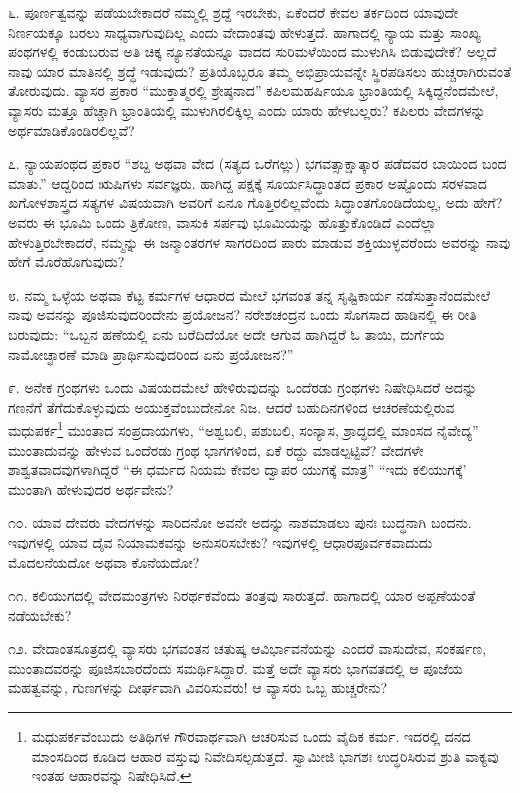 ೬. ಪೂರ್ಣತ್ವವನ್ನು ಪಡೆಯಬೇಕಾದರೆ ನಮ್ಮಲ್ಲಿ ಶ್ರದ್ದೆ ಇರಬೇಕು, ಏಕೆಂದರೆ ಕೇವಲ ತರ್ಕದಿಂದ ಯಾವುದೇ ನಿರ್ಣಯಕ್ಕೂ ಬರಲು ಸಾಧ್ಯವಾಗುವುದಿಲ್ಲ ಎಂದು ವೇದಾಂತವು ಹೇಳುತ್ತದೆ. ಹಾಗಾದಲ್ಲಿ ನ್ಯಾಯ ಮತ್ತು ಸಾಂಖ್ಯ ಪಂಥಗಳಲ್ಲಿ ಕಂಡುಬರುವ ಅತಿ ಚಿಕ್ಕ ನ್ಯೂನತೆಯನ್ನೂ ವಾದದ ಸುರಿಮಳೆಯಿಂದ ಮುಳುಗಿಸಿ ಬಿಡುವುದೇಕೆ? ಅಲ್ಲದೆ ನಾವು ಯಾರ ಮಾತಿನಲ್ಲಿ ಶ್ರದ್ಧೆ ಇಡುವುದು? ಪ್ರತಿಯೊಬ್ಬರೂ ತಮ್ಮ ಅಭಿಪ್ರಾಯವನ್ನೇ ಸ್ಥಿರಪಡಿಸಲು ಹುಚ್ಚರಾಗಿರುವಂತೆ ತೋರುವುದು. ವ್ಯಾಸರ ಪ್ರಕಾರ “ಮುಕ್ತಾತ್ಮರಲ್ಲಿ ಶ್ರೇಷ್ಠನಾದ” ಕಪಿಲಮಹರ್ಷಿಯೂ ಭ್ರಾಂತಿಯಲ್ಲಿ ಸಿಕ್ಕಿದ್ದನೆಂದಮೇಲೆ, ವ್ಯಾಸರು ಮತ್ತೂ ಹೆಚ್ಚಾಗಿ ಭ್ರಾಂತಿಯಲ್ಲಿ ಮುಳುಗಿರಲಿಕ್ಕಿಲ್ಲ ಎಂದು ಯಾರು ಹೇಳಬಲ್ಲರು? ಕಪಿಲರು ವೇದಗಳನ್ನು ಅರ್ಥಮಾಡಿಕೊಂಡಿರಲಿಲ್ಲವೆ?

೭. ನ್ಯಾಯಪಂಥದ ಪ್ರಕಾರ “ಶಬ್ದ ಅಥವಾ ವೇದ (ಸತ್ಯದ ಒರೆಗಲ್ಲು) ಭಗವತ್ಸಾಕ್ಷಾತ್ಕಾರ ಪಡೆದವರ ಬಾಯಿಂದ ಬಂದ ಮಾತು.” ಆದ್ದರಿಂದ ಋಷಿಗಳು ಸರ್ವಜ್ಞರು. ಹಾಗಿದ್ದ ಪಕ್ಷಕ್ಕೆ ಸೂರ್ಯಸಿದ್ಧಾಂತದ ಪ್ರಕಾರ ಅಷ್ಟೊಂದು ಸರಳವಾದ ಖಗೋಳಶಾಸ್ತ್ರದ ಸತ್ಯಗಳ ವಿಷಯವಾಗಿ ಅವರಿಗೆ ಏನೂ ಗೊತ್ತಿರಲಿಲ್ಲವೆಂದು ಸಿದ್ಧಾಂತಗೊಂಡಿದೆಯಲ್ಲ, ಅದು ಹೇಗೆ? ಅವರು ಈ ಭೂಮಿ ಒಂದು ತ್ರಿಕೋಣ, ವಾಸುಕಿ ಸರ್ಪವು ಭೂಮಿಯನ್ನು ಹೊತ್ತುಕೊಂಡಿದೆ ಎಂದೆಲ್ಲಾ ಹೇಳುತ್ತಿರಬೇಕಾದರೆ, ನಮ್ಮನ್ನು ಈ ಜನ್ಮಾಂತರಗಳ ಸಾಗರ\break ದಿಂದ ಪಾರು ಮಾಡುವ ಶಕ್ತಿಯುಳ್ಳವರೆಂದು ಅವರನ್ನು ನಾವು ಹೇಗೆ ಮೊರೆಹೊಗುವುದು?

೮. ನಮ್ಮ ಒಳ್ಳೆಯ ಅಥವಾ ಕೆಟ್ಟ ಕರ್ಮಗಳ ಆಧಾರದ ಮೇಲೆ ಭಗವಂತ ತನ್ನ ಸೃಷ್ಟಿಕಾರ್ಯ ನಡೆಸುತ್ತಾನೆಂದಮೇಲೆ ನಾವು ಅವನನ್ನು ಪೂಜಿಸುವುದರಿಂದೇನು ಪ್ರಯೋಜನ? ನರೇಶಚಂದ್ರನ ಒಂದು ಸೊಗಸಾದ ಹಾಡಿನಲ್ಲಿ ಈ ರೀತಿ ಬರುವುದು: “ಒಬ್ಬನ ಹಣೆಯಲ್ಲಿ ಏನು ಬರೆದಿದೆಯೋ ಅದೇ ಆಗುವ ಹಾಗಿದ್ದರೆ ಓ ತಾಯಿ, ದುರ್ಗೆಯ ನಾಮೋಚ್ಛಾರಣೆ ಮಾಡಿ ಪ್ರಾರ್ಥಿಸುವುದರಿಂದ ಏನು ಪ್ರಯೋಜನ?”

೯. ಅನೇಕ ಗ್ರಂಥಗಳು ಒಂದು ವಿಷಯದಮೇಲೆ ಹೇಳಿರುವುದನ್ನು ಒಂದೆರಡು ಗ್ರಂಥಗಳು ನಿಷೇಧಿಸಿದರೆ ಅದನ್ನು ಗಣನೆಗೆ ತೆಗೆದುಕೊಳ್ಳುವುದು ಅಯುಕ್ತವೆಂಬುದೇನೋ ನಿಜ. ಆದರೆ ಬಹುದಿನಗಳಿಂದ ಆಚರಣೆಯಲ್ಲಿರುವ ಮಧುಪರ್ಕ\footnote{ಮಧುಪರ್ಕವೆಂಬುದು ಅತಿಥಿಗಳ ಗೌರವಾರ್ಥವಾಗಿ ಆಚರಿಸುವ ಒಂದು ವೈದಿಕ ಕರ್ಮ. ಇದರಲ್ಲಿ ದನದ ಮಾಂಸದಿಂದ ಕೂಡಿದ ಆಹಾರ ವಸ್ತುವು ನಿವೇದಿಸಲ್ಪಡುತ್ತದೆ. ಸ್ವಾಮೀಜಿ ಭಾಗಶಃ ಉದ್ಧರಿಸಿರುವ ಶ್ರುತಿ ವಾಕ್ಯವು ಇಂತಹ ಆಹಾರವನ್ನು ನಿಷೇಧಿಸಿದೆ.} ಮುಂತಾದ ಸಂಪ್ರದಾಯಗಳು, “ಅಶ್ವಬಲಿ, ಪಶುಬಲಿ, ಸಂನ್ಯಾಸ, ಶ್ರಾದ್ಧದಲ್ಲಿ ಮಾಂಸದ ನೈವೇದ್ಯ” \enginline{-} ಮುಂತಾದುವನ್ನು ಹೇಳುವ ಒಂದೆರಡು ಗ್ರಂಥ ಭಾಗಗಳಿಂದ, ಏಕೆ ರದ್ದು ಮಾಡಲ್ಪಟ್ಟಿವೆ? ವೇದಗಳೇ ಶಾಶ್ವತವಾದವುಗಳಾಗಿದ್ದರೆ “ಈ ಧರ್ಮದ ನಿಯಮ ಕೇವಲ ದ್ವಾಪರ ಯುಗಕ್ಕೆ ಮಾತ್ರ” “ಇದು ಕಲಿಯುಗಕ್ಕೆ’ ಮುಂತಾಗಿ ಹೇಳುವುದರ ಅರ್ಥವೇನು?

೧೦. ಯಾವ ದೇವರು ವೇದಗಳನ್ನು ಸಾರಿದನೋ ಅವನೇ ಅದನ್ನು ನಾಶ\break ಮಾಡಲು ಪುನಃ ಬುದ್ಧನಾಗಿ ಬಂದನು. ಇವುಗಳಲ್ಲಿ ಯಾವ ದೈವ ನಿಯಾಮಕವನ್ನು ಅನುಸರಿಸಬೇಕು? ಇವುಗಳಲ್ಲಿ ಆಧಾರಪೂರ್ವಕವಾದುದು ಮೊದಲನೆಯದೋ ಅಥವಾ ಕೊನೆಯದೋ?

೧೧. ಕಲಿಯುಗದಲ್ಲಿ ವೇದಮಂತ್ರಗಳು ನಿರರ್ಥಕವೆಂದು ತಂತ್ರವು ಸಾರುತ್ತದೆ. ಹಾಗಾದಲ್ಲಿ ಯಾರ ಅಪ್ಪಣೆಯಂತೆ ನಡೆಯಬೇಕು?

೧೨. ವೇದಾಂತಸೂತ್ರದಲ್ಲಿ ವ್ಯಾಸರು ಭಗವಂತನ ಚತುಷ್ಕ ಆವಿರ್ಭಾವನೆಯನ್ನು ಎಂದರೆ ವಾಸುದೇವ, ಸಂಕರ್ಷಣ, ಮುಂತಾದವರನ್ನು ಪೂಜಿಸಬಾರದೆಂದು ಸಮರ್ಥಿಸಿದ್ದಾರೆ. ಮತ್ತೆ ಅದೇ ವ್ಯಾಸರು ಭಾಗವತದಲ್ಲಿ ಆ ಪೂಜೆಯ ಮಹತ್ವವನ್ನು, ಗುಣಗಳನ್ನು ದೀರ್ಘವಾಗಿ ವಿವರಿಸುವರು! ಆ ವ್ಯಾಸರು ಒಬ್ಬ ಹುಚ್ಚರೇನು?

